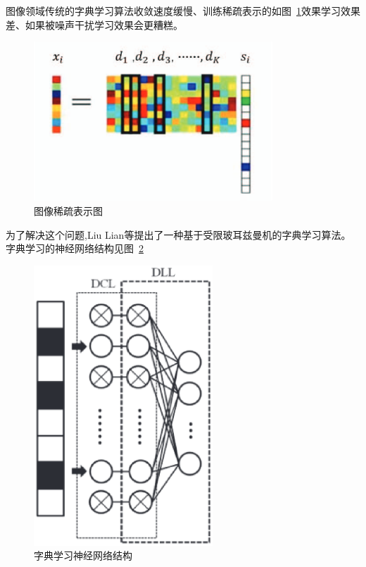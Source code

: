 \documentclass[12pt,a4paper,UTF8]{ctexart}
\begin{document}
图像领域传统的字典学习算法收敛速度缓慢、训练稀疏表示的如图~\ref{fig:图像稀疏表示图}效果学习效果差、如果被噪声干扰学习效果会更糟糕。
\begin{figure}[htpb]
    \centering
    \includegraphics[width=0.8\textwidth]{allpicture/图像稀疏表示图.eps}
    \caption{图像稀疏表示图}
    \label{fig:图像稀疏表示图}
\end{figure}
为了解决这个问题,Liu Lian等\cite{lianDictionaryLearningAlgorithm2021}提出了一种基于受限玻耳兹曼机的字典学习算法。
字典学习的神经网络结构见图~\ref{fig:字典学习神经网络结构}
\begin{figure}[htpb]
    \centering
    \includegraphics[width=0.6\textwidth]{allpicture/字典学习神经网络结构.eps}
    \caption{字典学习神经网络结构}
    \label{fig:字典学习神经网络结构}
\end{figure}
\end{document}
